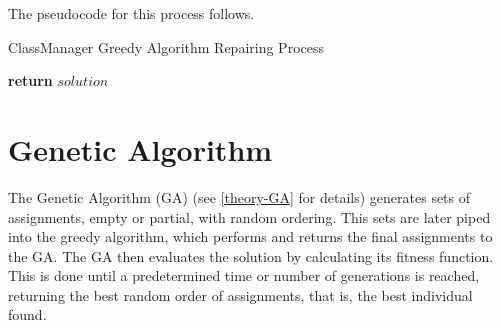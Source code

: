 The pseudocode for this process follows.

\begin{algorithm}[H]
    \caption{ClassManager Greedy Algorithm Repairing Process}
    \begin{algorithmic}[1]
                         
                    \EndIf
                         
                    \Else
                         
                    \EndIf
                \EndFor
            \EndFor
            \State \textbf{return} $solution$
        \EndProcedure
    \end{algorithmic}
\end{algorithm}



\section{Genetic Algorithm}

The Genetic Algorithm (GA) (see \ref{theory-GA} for details) generates sets of assignments, empty or partial, with random ordering. This sets are later piped into the greedy algorithm, which performs and returns the final assignments to the GA. The GA then evaluates the solution by calculating its fitness function. This is done until a predetermined time or number of generations is reached, returning the best random order of assignments, that is, the best individual found.

